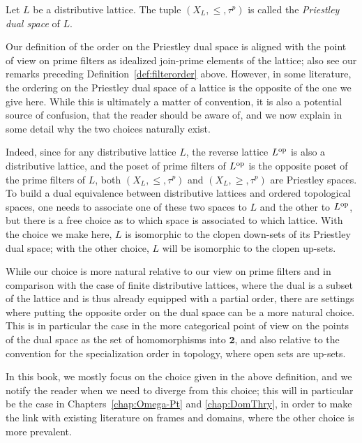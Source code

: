 \begin{definition}\label{def:Priestleydualspace}
Let $L$ be a distributive lattice. The tuple $(X_L, \leq, \tau^p)$ is called the \emph{Priestley dual space} of $L$.
\end{definition}
\begin{remark}\label{rem:order-choice}
Our definition of the order on the Priestley dual space is aligned with the point of view on prime filters as idealized join-prime elements of the lattice; also see our remarks preceding Definition~\ref{def:filterorder} above. However, in some literature, the ordering on the Priestley dual space of a lattice is the opposite of the one we give here. While this is ultimately a matter of convention, it is also a potential source of confusion, that the reader should be aware of, and we now explain in some detail why the two choices naturally exist.

Indeed, since for any distributive lattice $L$, the reverse lattice $L^{\mathrm{op}}$ is also a distributive lattice, and the poset of prime filters of $L^{\mathrm{op}}$ is the opposite poset of the prime filters of $L$, both $(X_L, \leq, \tau^p)$ and $(X_L, \geq, \tau^p)$ are Priestley spaces. To build a dual equivalence between distributive lattices and ordered topological spaces, one needs to associate one of these two spaces to $L$ and the other to $L^{\mathrm{op}}$, but there is a free choice as to which space is associated to which lattice. With the choice we make here, $L$ is isomorphic to the clopen down-sets of its Priestley dual space; with the other choice, $L$ will be isomorphic to the clopen up-sets. 

While our choice is more natural relative to our view on prime filters and in comparison with the case of finite distributive lattices, where the dual is a subset of the lattice and is thus already equipped with a partial order, there are settings where putting the opposite order on the dual space can be a more natural choice. This is in particular the case in the more categorical point of view on the points of the dual space as the set of homomorphisms into $\mathbf{2}$, and also relative to the convention for the specialization order in topology, where open sets are up-sets.

In this book, we mostly focus on the choice given in the above definition, and we notify the reader when we need to diverge from this choice; this will in particular be the case in Chapters~\ref{chap:Omega-Pt} and \ref{chap:DomThry}, in order to make the link with existing literature on frames and domains, where the other choice is more prevalent.
\end{remark}
